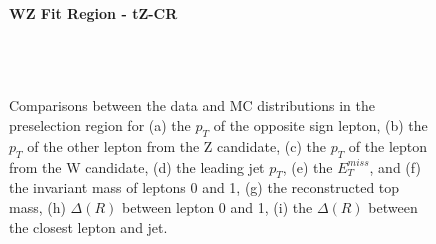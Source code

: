 \begin{figure}[H] 
    \centering
    \textbf{WZ Fit Region - tZ-CR}\\
    \\
    \\
    \\
    \caption{Comparisons between the data and MC distributions in the preselection region for (a) the $p_T$ of the opposite sign lepton, (b) the $p_T$ of the other lepton from the Z candidate, (c) the $p_T$ of the lepton from the W candidate, (d) the leading jet $p_T$, (e) the $E_T^{miss}$, and (f) the invariant mass of leptons 0 and 1, (g) the reconstructed top mass, (h) $\Delta(R)$  between lepton 0 and 1, (i) the $\Delta(R)$ between the closest lepton and jet.}
    \label{kin:tZ_CR_1j}
\end{figure}

